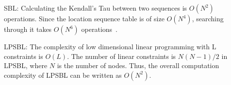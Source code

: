SBL: Calculating the Kendall’s Tau
between two sequences is $O(N^2)$ operations. Since the location sequence table is of size
$O(N^4)$, searching through it takes $O(N^6)$ operations~\cite{yedavalli2008sequence}.

LPSBL: The complexity of low dimensional linear programming
with L constraints is $O(L)$\cite{Griva2009}. The number of linear constraints is $N(N-1)/2$ in LPSBL,
where $N$ is the number of nodes. Thus, the overall computation
complexity of LPSBL can be written as $O(N^2)$.



